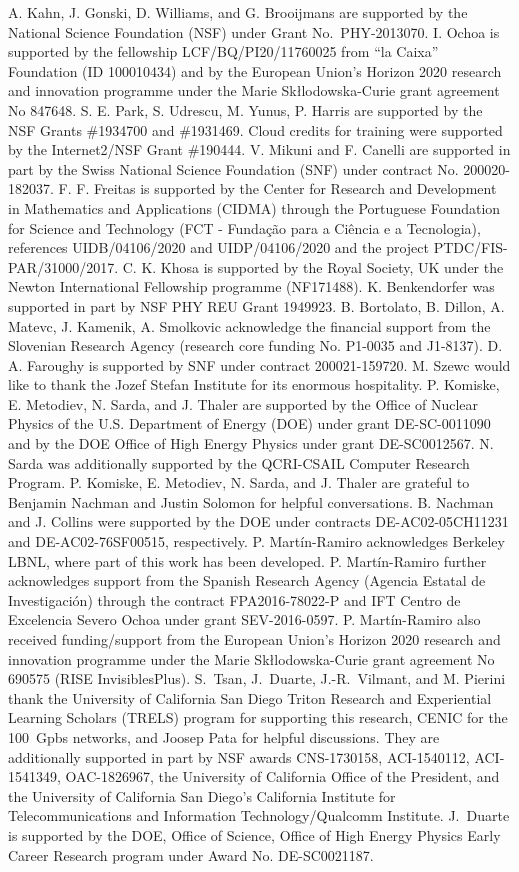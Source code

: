 \documentclass[a4paper,11pt]{article}
\begin{document}
A. Kahn, J. Gonski, D. Williams, and G. Brooijmans are supported by the National Science Foundation (NSF) under Grant No.~PHY-2013070.  I. Ochoa is supported by the fellowship LCF/BQ/PI20/11760025 from ``la Caixa'' Foundation (ID 100010434) and by the European Union’s Horizon 2020 research and innovation programme under the Marie Sk\l{l}odowska-Curie grant agreement No 847648.  S. E. Park, S. Udrescu, M. Yunus, P. Harris are supported by the NSF Grants \#1934700 and \#1931469.   Cloud credits for training were supported by the Internet2/NSF Grant \#190444.  V. Mikuni and F. Canelli are supported in part by the Swiss National Science Foundation (SNF) under contract No. 200020-182037.  F. F. Freitas is supported by the Center for Research and Development in Mathematics and Applications (CIDMA) through the Portuguese Foundation for Science and Technology (FCT - Funda\c{c}\~{a}o para a Ciência e a Tecnologia), references UIDB/04106/2020 and UIDP/04106/2020 and the project PTDC/FIS-PAR/31000/2017. C. K. Khosa is supported by the Royal Society, UK under the Newton International Fellowship programme (NF171488).   K. Benkendorfer was supported in part by NSF PHY REU Grant 1949923.  B. Bortolato, B. Dillon, A. Matevc, J. Kamenik, A. Smolkovic acknowledge the financial support from the Slovenian Research Agency (research core funding No. P1-0035 and J1-8137).  D. A. Faroughy is supported by SNF under contract 200021-159720.  M. Szewc would like to thank the Jozef Stefan Institute for its enormous hospitality.  P. Komiske, E. Metodiev, N. Sarda, and J. Thaler are supported by the Office of Nuclear Physics of the U.S. Department of Energy (DOE) under grant DE-SC-0011090 and by the DOE Office of High Energy Physics under grant DE-SC0012567.  N. Sarda was additionally supported by the QCRI-CSAIL Computer Research Program.  P. Komiske, E. Metodiev, N. Sarda, and J. Thaler are grateful to Benjamin Nachman and Justin Solomon for helpful conversations.  B. Nachman and J. Collins were supported by the DOE under contracts DE-AC02-05CH11231 and DE-AC02-76SF00515, respectively. P. Mart\'in-Ramiro acknowledges Berkeley LBNL, where part of this work has been developed. P. Mart\'in-Ramiro further acknowledges support from the Spanish Research Agency (Agencia Estatal de Investigaci\'on) through the contract FPA2016-78022-P and IFT Centro de Excelencia Severo Ochoa under grant SEV-2016-0597.  P. Mart\'in-Ramiro also received funding/support from the European Union’s Horizon 2020 research and innovation programme under the Marie Sk\l{l}odowska-Curie grant agreement No 690575 (RISE InvisiblesPlus).  S.~Tsan, J.~Duarte, J.-R.~Vilmant, and M. Pierini thank the University of California San Diego Triton Research and Experiential Learning Scholars (TRELS) program for supporting this research, CENIC for the 100~Gpbs networks, and Joosep Pata for helpful discussions.  They are additionally supported in part by NSF awards CNS-1730158, ACI-1540112, ACI-1541349, OAC-1826967, the University of California Office of the President, and the University of California San Diego's California Institute for Telecommunications and Information Technology/Qualcomm Institute.  J.~Duarte is supported by the DOE, Office of Science, Office of High Energy Physics Early Career Research program under Award No. DE-SC0021187. 
\end{document}
